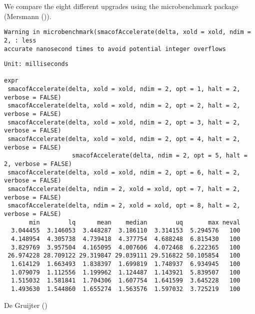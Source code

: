 \documentclass[
  12pt,
  letterpaper,
  DIV=11,
  numbers=noendperiod]{scrartcl}
\begin{document}
We compare the eight different upgrades using the microbenchmark package
(Mersmann ()).

\begin{verbatim}
Warning in microbenchmark(smacofAccelerate(delta, xold = xold, ndim = 2, : less
accurate nanosecond times to avoid potential integer overflows
\end{verbatim}

\begin{verbatim}
Unit: milliseconds
                                                                                    expr
 smacofAccelerate(delta, xold = xold, ndim = 2, opt = 1, halt = 2,      verbose = FALSE)
 smacofAccelerate(delta, xold = xold, ndim = 2, opt = 2, halt = 2,      verbose = FALSE)
 smacofAccelerate(delta, xold = xold, ndim = 2, opt = 3, halt = 2,      verbose = FALSE)
 smacofAccelerate(delta, xold = xold, ndim = 2, opt = 4, halt = 2,      verbose = FALSE)
                   smacofAccelerate(delta, ndim = 2, opt = 5, halt = 2, verbose = FALSE)
 smacofAccelerate(delta, xold = xold, ndim = 2, opt = 6, halt = 2,      verbose = FALSE)
 smacofAccelerate(delta, ndim = 2, xold = xold, opt = 7, halt = 2,      verbose = FALSE)
 smacofAccelerate(delta, ndim = 2, xold = xold, opt = 8, halt = 2,      verbose = FALSE)
       min        lq      mean    median        uq       max neval
  3.044455  3.146053  3.448287  3.186110  3.314153  5.294576   100
  4.148954  4.305738  4.739418  4.377754  4.688248  6.815430   100
  3.829769  3.957504  4.165095  4.007606  4.072468  6.222365   100
 26.974228 28.709122 29.319847 29.039111 29.516822 50.105854   100
  1.614129  1.663493  1.838397  1.699819  1.748937  6.934945   100
  1.079079  1.112556  1.199962  1.124487  1.143921  5.839507   100
  1.515032  1.581841  1.704306  1.607754  1.641599  3.645228   100
  1.493630  1.544860  1.655274  1.563576  1.597032  3.725219   100
\end{verbatim}

De Gruijter ()
\end{document}
